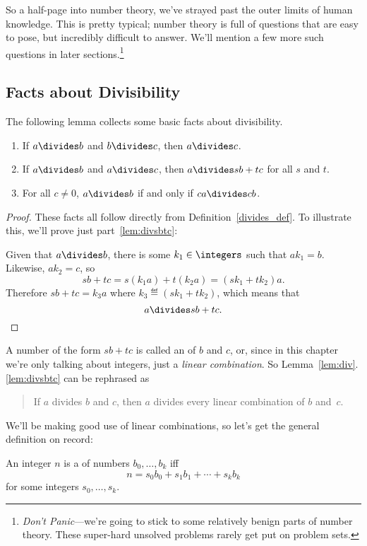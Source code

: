 So a half-page into number theory, we've strayed past the outer limits of human knowledge.
This is pretty typical; number theory is full of questions that are easy to pose, but
incredibly difficult to answer.  We'll mention a few more such questions in later
sections.\footnote{\emph{Don't Panic}---we're going to stick to some relatively benign
  parts of number theory.  These super-hard unsolved problems rarely get put on problem
  sets.}

\subsection{Facts about Divisibility}

The following lemma collects some basic facts about divisibility.

\begin{lemma}\label{lem:div}\mbox{}
\begin{enumerate}

\item\label{lem:divtrans} If $a \divides b$ and $b \divides c$, then $a \divides c$.

\item\label{lem:divsbtc} If $a \divides b$ and $a \divides c$, then $a \divides sb + tc$
  for all $s$ and $t$.

\item\label{lem:divcancel} For all $c \neq 0$, $a \divides b$ if and only if $ca \divides
  cb$.
\end{enumerate}
\end{lemma}

\begin{proof}
These facts all follow directly from Definition~\ref{divides_def}.  To
illustrate this, we'll prove just part~\ref{lem:divsbtc}:

Given that $a \divides b$, there is some $k_1 \in \integers$ such that $a k_1 = b$.
Likewise, $a k_2 = c$, so
\[
sb+tc= s(k_1a) + t(k_2a) = (sk_1+tk_2)a.
\]
Therefore $sb+tc = k_3a$ where $k_3 \eqdef (sk_1+tk_2)$, which means that
\[
a \divides sb+tc.
\]
\end{proof}

A number of the form $sb+tc$ is called an  of $b$ and $c$, or, since in this chapter we're only
talking about integers, just a \emph{linear combination}.  So
Lemma~\ref{lem:div}.\ref{lem:divsbtc} can be rephrased as
\begin{quote}
If $a$ divides $b$ and $c$, then $a$ divides every linear combination
of $b$ and~$c$.
\end{quote}
We'll be making good use of linear combinations, so let's get the
general definition on record:
\begin{definition}\label{linear_def}
An integer $n$ is a  of numbers $b_0,\dots,b_k$ iff
\[
n = s_0b_0+s_1b_1+\cdots+s_kb_k
\]
for some integers $s_0,\dots,s_k$.
\end{definition}

